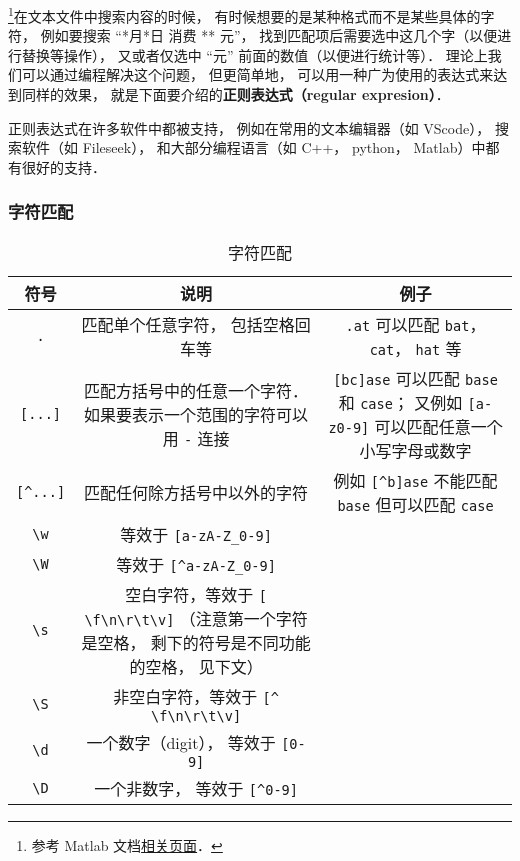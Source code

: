
\begin{issues}
\issueDraft
{}
\end{issues}


\footnote{参考 Matlab 文档\href{https://www.mathworks.com/help/matlab/ref/regexp.html}{相关页面}．}在文本文件中搜索内容的时候， 有时候想要的是某种格式而不是某些具体的字符， 例如要搜索 “*月*日 消费 ** 元”， 找到匹配项后需要选中这几个字（以便进行替换等操作）， 又或者仅选中 “元” 前面的数值（以便进行统计等）． 理论上我们可以通过编程解决这个问题， 但更简单地， 可以用一种广为使用的表达式来达到同样的效果， 就是下面要介绍的\textbf{正则表达式（regular expresion）}．

正则表达式在许多软件中都被支持， 例如在常用的文本编辑器（如 VScode）， 搜索软件（如 Fileseek）， 和大部分编程语言（如 C++， python， Matlab）中都有很好的支持．

\subsubsection{字符匹配}
\begin{table}[ht]
\centering
\caption{字符匹配}\label{regex_tab1}
\begin{tabular}{|c|c|c|}
\hline
符号 & 说明 & 例子 \\
\hline
\verb|.| & 匹配单个任意字符， 包括空格回车等 & \verb|.at| 可以匹配 \verb|bat|， \verb|cat|， \verb|hat| 等 \\
\hline
\verb|[...]| & 匹配方括号中的任意一个字符． 如果要表示一个范围的字符可以用 \verb|-| 连接 & \verb|[bc]ase| 可以匹配 \verb|base| 和 \verb|case|； 又例如 \verb|[a-z0-9]| 可以匹配任意一个小写字母或数字 \\
\hline
\verb|[^...]| & 匹配任何除方括号中以外的字符 & 例如 \verb|[^b]ase| 不能匹配 \verb|base| 但可以匹配 \verb|case| \\
\hline
\verb|\w| & 等效于 \verb|[a-zA-Z_0-9]| &  \\
\hline
\verb|\W| & 等效于 \verb|[^a-zA-Z_0-9]| &  \\
\hline
\verb|\s| & 空白字符，等效于 \verb|[ \f\n\r\t\v]| （注意第一个字符是空格， 剩下的符号是不同功能的空格， 见下文） &  \\
\hline
\verb|\S| & 非空白字符，等效于 \verb|[^ \f\n\r\t\v]| & \\
\hline
\verb|\d| & 一个数字（digit）， 等效于 \verb|[0-9]| & \\
\hline
\verb|\D| & 一个非数字， 等效于 \verb|[^0-9]| & \\
\hline
\end{tabular}
\end{table}

